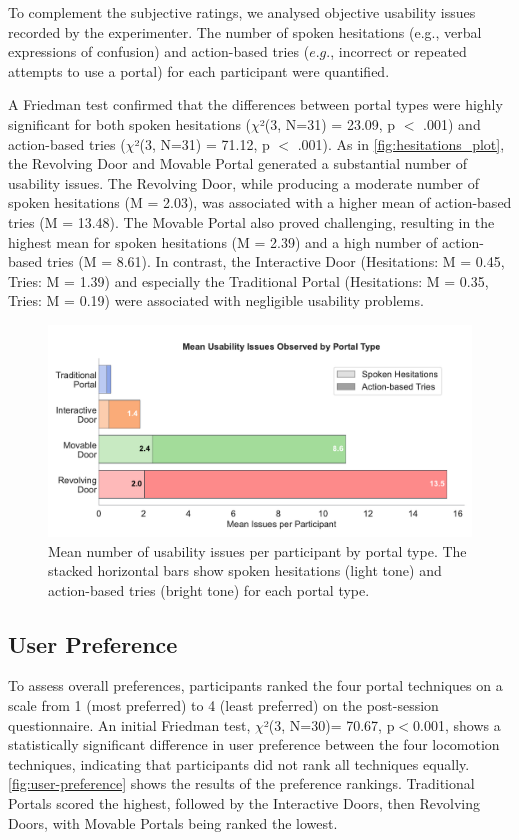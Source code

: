 To complement the subjective ratings, we analysed objective usability issues recorded by the experimenter. 
The number of spoken hesitations (e.g., verbal expressions of confusion) and action-based tries 
($e.g.$, incorrect or repeated attempts to use a portal) for each participant were quantified.

A Friedman test confirmed that the differences between portal types were highly significant for both spoken hesitations 
($\chi$²(3, N=31) = 23.09, p $<$ .001) and action-based tries ($\chi$²(3, N=31) = 71.12, p $<$ .001). As in \autoref{fig:hesitations_plot}, 
the Revolving Door and Movable Portal generated a substantial number of usability issues. The Revolving Door, while producing a moderate 
number of spoken hesitations (M = 2.03), was associated with a higher mean of action-based tries (M = 13.48). The Movable Portal also 
proved challenging, resulting in the highest mean for spoken hesitations (M = 2.39) and a high number of action-based tries (M = 8.61). 
In contrast, the Interactive Door (Hesitations: M = 0.45, Tries: M = 1.39) and especially the Traditional Portal (Hesitations: M = 0.35, 
Tries: M = 0.19) were associated with negligible usability problems.

\begin{figure}[t]
\centering
\includegraphics[width=.8\textwidth]{NOVAthesisFiles/Images/graphs/hesitations_stacked_horizontal_plot.pdf}
\caption{Mean number of usability issues per participant by portal type. The stacked horizontal bars show spoken hesitations (light tone) and action-based tries (bright tone) for each portal type.}
\label{fig:hesitations_plot}
\end{figure}


\subsection{User Preference}

To assess overall preferences, participants ranked the four portal techniques on a scale from 1 (most preferred) to 4 (least preferred) 
on the post-session questionnaire. An initial Friedman test, $\chi$²(3, N=30)= 70.67, p$<$0.001, shows a statistically significant 
difference in user preference between the four locomotion techniques, indicating that participants did not rank all techniques equally. 
\autoref{fig:user-preference} shows the results of the preference rankings. Traditional Portals scored the highest, followed by the 
Interactive Doors, then Revolving Doors, with Movable Portals being ranked the lowest. 

